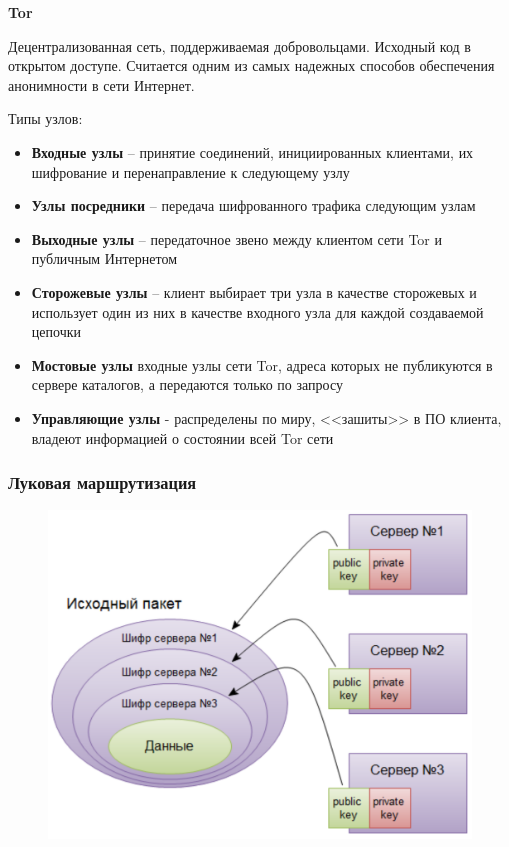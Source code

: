 \textbf{Tor}

Децентрализованная сеть, поддерживаемая добровольцами. Исходный код в открытом доступе. Считается одним из самых надежных способов обеспечения анонимности в сети Интернет.

Типы узлов:
\begin{itemize}
    \item \textbf{Входные узлы} -- принятие соединений, инициированных клиентами, их шифрование и перенаправление к следующему узлу
    \item \textbf{Узлы посредники} -- передача шифрованного трафика следующим узлам
    \item \textbf{Выходные узлы} -- передаточное звено между клиентом сети Tor и публичным Интернетом
    \item \textbf{Сторожевые узлы} -- клиент выбирает три узла в качестве сторожевых и использует один из них в качестве входного узла для каждой создаваемой цепочки
    \item \textbf{Мостовые узлы} входные узлы сети Tor, адреса которых не публикуются в сервере каталогов, а передаются только по запросу
    \item \textbf{Управляющие узлы} - распределены по миру, <<зашиты>> в ПО клиента, владеют информацией о состоянии всей Tor сети
\end{itemize}

\subsubsection{Луковая маршрутизация}

\begin{figure}
\vspace{-6.5ex}
\includegraphics[scale=0.18]{pics/onion-routing.png}
\end{figure}

